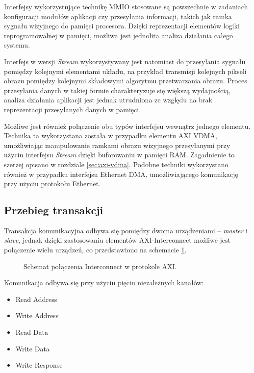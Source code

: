 Interfejsy wykorzystujące technikę MMIO stosowane są powszechnie w zadaniach konfiguracji modułów aplikacji czy przesyłania informacji, takich jak ramka sygnału wizyjnego do pamięci procesora. 
Dzięki reprezentacji elementów logiki reprogramowalnej w pamięci, możliwa jest jednolita analiza działania całego systemu. %

Interfejs w wersji \emph{Stream} wykorzystywany jest natomiast do przesyłania sygnału pomiędzy kolejnymi elementami układu, na przykład transmisji kolejnych pikseli obrazu pomiędzy kolejnymi składowymi algorytmu przetwarzania obrazu. 
Proces przesyłania danych w takiej formie charakteryzuje się większą wydajnością, analiza działania aplikacji jest jednak utrudniona ze względu na brak reprezentacji przesyłanych danych w pamięci.

Możliwe jest również połączenie obu typów interfejsu wewnątrz jednego elementu. 
Technika ta wykorzystana została w przypadku elementu AXI VDMA, umożliwiając manipulowanie ramkami obrazu wizyjnego przesyłanymi przy użyciu interfejsu \emph{Stream} dzięki buforowaniu w pamięci RAM. 
Zagadnienie to szerzej opisano w rozdziale \ref{sec:axi-vdma}. 
Podobne techniki wykorzystano również w przypadku interfejsu Ethernet DMA, umożliwiającego komunikację przy użyciu protokołu Ethernet.

\subsection{Przebieg transakcji}

Transakcja komunikacyjna odbywa się pomiędzy dwoma urządzeniami -- \emph{master} i \emph{slave}, jednak dzięki zastosowaniu elementów AXI-Interconnect możliwe jest połączenie wielu urządzeń, co przedstawiono na schemacie \ref{fig:axi-interconnect}.

\begin{figure}[h]
	\centering
	\def\svgwidth{8cm}
	
	\caption{Schemat połączenia Interconnect w protokole AXI.}
	\label{fig:axi-interconnect}
\end{figure}


Komunikacja odbywa się przy użyciu pięciu niezależnych kanałów:
\begin{itemize}
	\item Read Address
	\item Write Address
	\item Read Data
	\item Write Data
	\item Write Response
\end{itemize}

